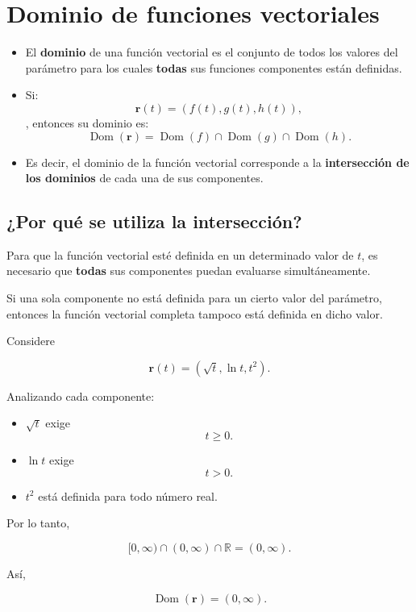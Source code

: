 \section{Dominio de funciones vectoriales}

\begin{definicion}
\begin{itemize}
    \item El \textbf{dominio} de una función vectorial es el conjunto de todos los valores del parámetro para los cuales \textbf{todas} sus funciones componentes están definidas.
    \item Si:
        \[
        \mathbf{r}(t)=\left(f(t),g(t),h(t)\right),
        \]
        , entonces su dominio es:
        \[
        \operatorname{Dom}(\mathbf{r})
        =
        \operatorname{Dom}(f)
        \cap
        \operatorname{Dom}(g)
        \cap
        \operatorname{Dom}(h).
        \]
        \item Es decir, el dominio de la función vectorial corresponde a la \textbf{intersección de los dominios} de cada una de sus componentes.
\end{itemize}
\end{definicion}


\subsection{¿Por qué se utiliza la intersección?}

Para que la función vectorial esté definida en un determinado valor de $t$, es necesario que \textbf{todas} sus componentes puedan evaluarse simultáneamente.

Si una sola componente no está definida para un cierto valor del parámetro, entonces la función vectorial completa tampoco está definida en dicho valor.

\begin{ejemplo}[]

Considere

\[
\mathbf{r}(t)=
\left(
\sqrt{t},
\ln t,
t^2
\right).
\]


Analizando cada componente:

\begin{itemize}
    \item $\sqrt{t}$ exige
    \[
    t\ge0.
    \]

    \item $\ln t$ exige
    \[
    t>0.
    \]

    \item $t^2$ está definida para todo número real.
\end{itemize}

Por lo tanto,

\[
[0,\infty)
\cap
(0,\infty)
\cap
\mathbb{R}
=
(0,\infty).
\]

Así,

\[
\boxed{\operatorname{Dom}(\mathbf{r})=(0,\infty).}
\]

\end{ejemplo}

